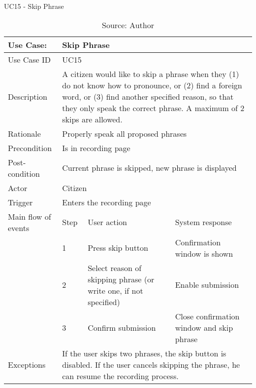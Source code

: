 \begin{table}[ht]
\centering
\caption{UC15 - Skip Phrase}
\label{uc:15}
\begin{tabular}{|p{3cm}|p{1cm}|p{5cm}|p{5cm}|}
\hline
Use Case:       & \multicolumn{3}{p{11cm}|}{Skip Phrase} \\ \hline
Use Case ID     & \multicolumn{3}{p{11cm}|}{UC15} \\ \hline
Description     & \multicolumn{3}{p{11cm}|}{A citizen would like to skip a phrase when they (1) do not know how to pronounce, or (2) find a foreign word, or (3) find another specified reason, so that they only speak the correct phrase. A maximum of 2 skips are allowed.} \\ \hline
Rationale       & \multicolumn{3}{p{11cm}|}{Properly speak all proposed phrases} \\ \hline
Precondition    & \multicolumn{3}{p{11cm}|}{Is in recording page} \\ \hline
Post-condition  & \multicolumn{3}{p{11cm}|}{Current phrase is skipped, new phrase is displayed} \\ \hline
Actor           & \multicolumn{3}{p{11cm}|}{Citizen} \\ \hline
Trigger         & \multicolumn{3}{p{11cm}|}{Enters the recording page} \\ \hline
Main flow of events & Step  & User action & System response \\ \hline
                    & 1     & Press skip button & Confirmation window is shown \\ \hline
                    & 2     & Select reason of skipping phrase (or write one, if not specified) & Enable submission \\ \hline
                    & 3     & Confirm submission & Close confirmation window and skip phrase \\ \hline
Exceptions      & \multicolumn{3}{p{11cm}|}{If the user skips two phrases, the skip button is disabled. If the user cancels skipping the phrase, he can resume the recording process.} \\ \hline
\end{tabular}
\caption*{Source: Author}
\end{table}

